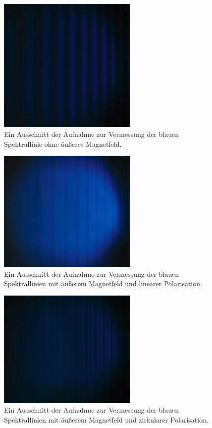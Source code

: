 \begin{figure}
  \centering
  \includegraphics[width=0.6\textwidth]{Pics/blauohneb.png}
  \caption{Ein Ausschnitt der Aufnahme zur Vermessung der blauen Spektrallinie ohne äußeres Magnetfeld.}
  \label{fig:blauohneb}
\end{figure}

\begin{figure}
  \centering
  \includegraphics[width=0.6\textwidth]{Pics/blaup.png}
  \caption{Ein Ausschnitt der Aufnahme zur Vermessung der blauen Spektrallinien mit äußerem Magnetfeld und linearer Polarisation.}
  \label{fig:blaupi}
\end{figure}

\begin{figure}
  \centering
  \includegraphics[width=0.6\textwidth]{Pics/blaus.png}
  \caption{Ein Ausschnitt der Aufnahme zur Vermessung der blauen Spektrallinien mit äußerem Magnetfeld und zirkularer Polarisation.}
  \label{fig:blaus}
\end{figure}

